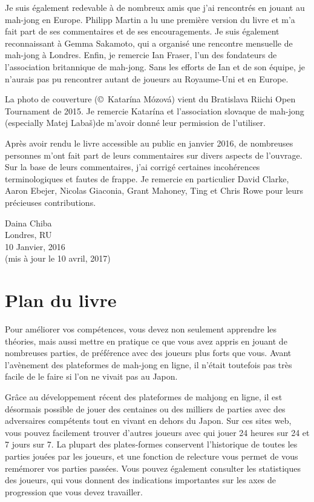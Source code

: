 \bigskip
Je suis également redevable à de nombreux amis que j'ai rencontrés en jouant au mah-jong en Europe. Philipp Martin a lu une première version du livre et m'a fait part de ses commentaires et de ses encouragements. Je suis également reconnaissant à Gemma Sakamoto, qui a organisé une rencontre mensuelle de mah-jong à Londres. 
Enfin, je remercie Ian Fraser, l'un des fondateurs de l'association britannique de mah-jong. 
Sans les efforts de Ian et de son équipe, je n'aurais pas pu rencontrer autant de joueurs au Royaume-Uni et en Europe.

\bigskip
La photo de couverture (\copyright~Katar\'{i}na M\'{o}zov\'{a}) vient du Bratislava Riichi Open Tournament de 2015. Je remercie Katar\'{i}na et l'association slovaque de mah-jong (especially Matej Laba\v{s})de m'avoir donné leur permission de l'utiliser.

\bigskip
Après avoir rendu le livre accessible au public en janvier 2016, de nombreuses personnes m'ont fait part de leurs commentaires sur divers aspects de l'ouvrage. Sur la base de leurs commentaires, j'ai corrigé certaines incohérences terminologiques et fautes de frappe. Je remercie en particulier David Clarke, Aaron Ebejer, Nicolas Giaconia, Grant Mahoney, Ting et Chris Rowe pour leurs précieuses contributions.

\vfill

\hfill Daina Chiba\\
\hfill Londres, RU\\
\hfill 10 Janvier, 2016\\
\hfill (mis à jour le 10 avril, 2017)

\section*{Plan du livre}

Pour améliorer vos compétences, vous devez non seulement apprendre les théories, mais aussi mettre en pratique ce que vous avez appris en jouant de nombreuses parties, de préférence avec des joueurs plus forts que vous. Avant l'avènement des plateformes de mah-jong en ligne, il n'était toutefois pas très facile de le faire si l'on ne vivait pas au Japon. 

\bigskip
Grâce au développement récent des plateformes de mahjong en ligne, il est désormais possible de jouer des centaines ou des milliers de parties avec des adversaires compétents tout en vivant en dehors du Japon. Sur ces sites web, vous pouvez facilement trouver d'autres joueurs avec qui jouer 24 heures sur 24 et 7 jours sur 7. La plupart des plates-formes conservent l'historique de toutes les parties jouées par les joueurs, et une fonction de relecture vous permet de vous remémorer vos parties passées. Vous pouvez également consulter les statistiques des joueurs, qui vous donnent des indications importantes sur les axes de progression que vous devez travailler.  

